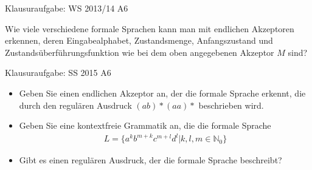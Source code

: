 \begin{frame}{Klausuraufgabe: WS 2013/14 A6}
  \begin{center}
  \end{center}
  Wie viele verschiedene formale Sprachen kann man mit endlichen Akzeptoren erkennen, deren Eingabealphabet, Zustandsmenge, Anfangszustand und Zustandsüberführungsfunktion wie bei dem oben angegebenen Akzeptor $M$ sind?\\
\end{frame}

\begin{frame}{Klausuraufgabe: SS 2015 A6}
  \begin{itemize}
    \item Geben Sie einen endlichen Akzeptor an, der die formale Sprache erkennt, die durch den regulären Ausdruck $(ab)*(aa)*$ beschrieben wird.
    \item Geben Sie eine kontextfreie Grammatik an, die die formale Sprache
      \begin{align*}
        L=\{a^kb^{m+k}c^{m+l}d^l|k,l,m\in\mathbb{N}_0\}
      \end{align*}
    \item Gibt es einen regulären Ausdruck, der die formale Sprache beschreibt?
  \end{itemize}
\end{frame}


